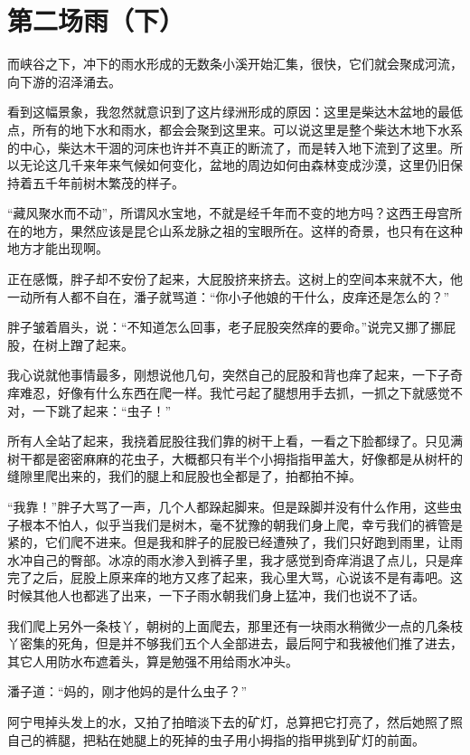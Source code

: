 \chapter{第二场雨（下）}

而峡谷之下，冲下的雨水形成的无数条小溪开始汇集，很快，它们就会聚成河流，向下游的沼泽涌去。

看到这幅景象，我忽然就意识到了这片绿洲形成的原因：这里是柴达木盆地的最低点，所有的地下水和雨水，都会会聚到这里来。可以说这里是整个柴达木地下水系的中心，柴达木干涸的河床也许并不真正的断流了，而是转入地下流到了这里。所以无论这几千来年来气候如何变化，盆地的周边如何由森林变成沙漠，这里仍旧保持着五千年前树木繁茂的样子。

“藏风聚水而不动”，所谓风水宝地，不就是经千年而不变的地方吗？这西王母宫所在的地方，果然应该是昆仑山系龙脉之祖的宝眼所在。这样的奇景，也只有在这种地方才能出现啊。

正在感慨，胖子却不安份了起来，大屁股挤来挤去。这树上的空间本来就不大，他一动所有人都不自在，潘子就骂道：“你小子他娘的干什么，皮痒还是怎么的？”

胖子皱着眉头，说：“不知道怎么回事，老子屁股突然痒的要命。”说完又挪了挪屁股，在树上蹭了起来。

我心说就他事情最多，刚想说他几句，突然自己的屁股和背也痒了起来，一下子奇痒难忍，好像有什么东西在爬一样。我忙弓起了腿想用手去抓，一抓之下就感觉不对，一下跳了起来：“虫子！”

所有人全站了起来，我挠着屁股往我们靠的树干上看，一看之下脸都绿了。只见满树干都是密密麻麻的花虫子，大概都只有半个小拇指指甲盖大，好像都是从树杆的缝隙里爬出来的，我们的腿上和屁股也全都是了，拍都拍不掉。

“我靠！”胖子大骂了一声，几个人都跺起脚来。但是跺脚并没有什么作用，这些虫子根本不怕人，似乎当我们是树木，毫不犹豫的朝我们身上爬，幸亏我们的裤管是紧的，它们爬不进来。但是我和胖子的屁股已经遭殃了，我们只好跑到雨里，让雨水冲自己的臀部。冰凉的雨水渗入到裤子里，我才感觉到奇痒消退了点儿，只是痒完了之后，屁股上原来痒的地方又疼了起来，我心里大骂，心说该不是有毒吧。这时候其他人也都逃了出来，一下子雨水朝我们身上猛冲，我们也说不了话。

我们爬上另外一条枝丫，朝树的上面爬去，那里还有一块雨水稍微少一点的几条枝丫密集的死角，但是并不够我们五个人全部进去，最后阿宁和我被他们推了进去，其它人用防水布遮着头，算是勉强不用给雨水冲头。

潘子道：“妈的，刚才他妈的是什么虫子？”

阿宁甩掉头发上的水，又拍了拍暗淡下去的矿灯，总算把它打亮了，然后她照了照自己的裤腿，把粘在她腿上的死掉的虫子用小拇指的指甲挑到矿灯的前面。

